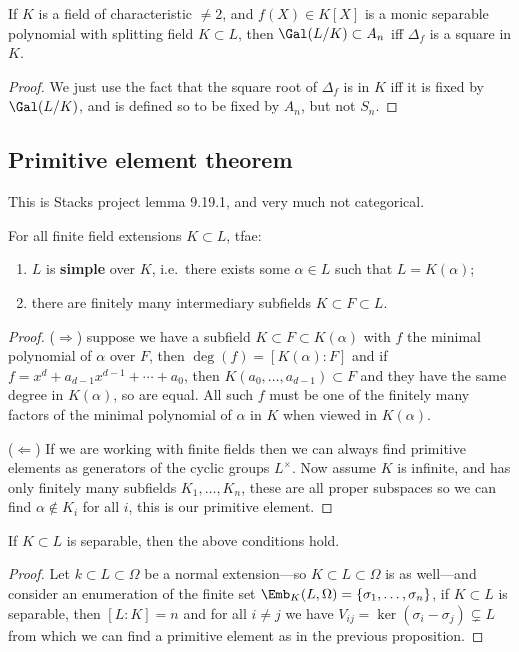 \documentclass{article}
\begin{document}
\begin{proposition}
    If $K$ is a field of characteristic $\neq 2$, and $f(X)\in K[X]$ is a monic separable polynomial with splitting field $K\subset L$, then $\Gal(L/K)\subset A_n$ iff $\Delta_f$ is a square in $K$.\begin{proof}
        We just use the fact that the square root of $\Delta_f$ is in $K$ iff it is fixed by $\Gal(L/K)$, and is defined so to be fixed by $A_n$, but not $S_n$.
    \end{proof}
\end{proposition}

\subsection{Primitive element theorem}

This is Stacks project lemma 9.19.1, and very much not categorical.

\begin{proposition}
        For all finite field extensions $K\subset L$, tfae: \begin{enumerate}
        \item $L$ is \textbf{simple} over $K$, i.e.~there exists some $\alpha \in L$ such that $L=K(\alpha)$;
        \item there are finitely many intermediary subfields $K\subset F \subset L$.
    \end{enumerate}
    \begin{proof}
        ($\Rightarrow$) suppose we have a subfield $K\subset F \subset K(\alpha)$ with $f$ the minimal polynomial of $\alpha$ over $F$, then $\deg(f)=[K(\alpha):F]$ and if $f=x^d + a_{d-1}x^{d-1}+\cdots + a_0$, then $K(a_0,\ldots,a_{d-1})\subset F$ and they have the same degree in $K(\alpha)$, so are equal. All such $f$ must be one of the finitely many factors of the minimal polynomial of $\alpha$ in $K$ when viewed in $K(\alpha)$.

        ($\Leftarrow$) If we are working with finite fields then we can always find primitive elements as generators of the cyclic groups $L^\times$. Now assume $K$ is infinite, and has only finitely many subfields $K_1,\ldots, K_n$, these are all proper subspaces so we can find $\alpha \not\in K_i$ for all $i$, this is our primitive element.
    \end{proof}
\end{proposition}

\begin{proposition}
        If $K\subset L$ is separable, then the above conditions hold.
    \begin{proof}
        Let $k\subset L\subset\Omega$ be a normal extension---so $K\subset L \subset \Omega$ is as well---and consider an enumeration of the finite set $\Emb_K(L,\Omega) = \{\sigma_1,\ldots,\sigma_n\}$, if $K\subset L$ is separable, then $[L:K]=n$ and for all $i\neq j$ we have $V_{ij} = \ker(\sigma_i-\sigma_j)\subsetneq L$ from which we can find a primitive element as in the previous proposition.
    \end{proof}
\end{proposition}
\end{document}
